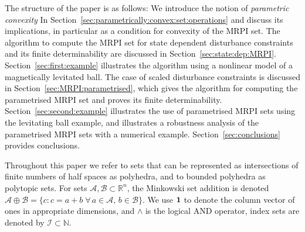 \documentclass[letterpaper, 10pt, conference]{ieeeconf} %
\begin{document}
The structure of the paper is as follows: We introduce the notion of \emph{parametric convexity} In
Section~\ref{sec:parametrically:convex:set:operations} and discuss its implications, in particular as a condition 
for convexity of the MRPI set. The algorithm to compute the MRPI set for state dependent disturbance
constraints and its finite determinability are discussed in Section~\ref{sec:state:dep:MRPI}.
Section~\ref{sec:first:example} illustrates the algorithm using a nonlinear model of a magnetically 
levitated ball. The case of scaled disturbance constraints is discussed in Section~\ref{sec:MRPI:parametrised},
which gives the algorithm for computing the parametrised MRPI set and
proves its finite determinability. Section~\ref{sec:second:example} illustrates the use of
parametrised MRPI sets using the levitating ball example, and illustrates a robustness analysis of the parametrised
MRPI sets with a numerical example. Section~\ref{sec:conclusions}
provides conclusions.

Throughout this paper we refer to sets that can be represented as intersections of finite numbers of half 
spaces as polyhedra, and to bounded polyhedra as polytopic sets. For sets $\mathcal A, \mathcal B 
\subset\mathbb R^n$, the Minkowski set addition is denoted $\mathcal A\oplus\mathcal B = \{c : c = a + 
b\; \forall\,a\in\mathcal A,\, b\in\mathcal B\}$. We use ${\bf{1}}$ to denote the column vector of ones 
in appropriate dimensions, and $\wedge$ is the logical AND operator, index sets are denoted by $\mathcal I
\subset\mathbb N$. 
%
%
%
\end{document}

